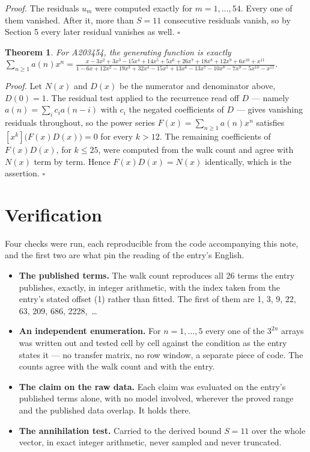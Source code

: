 \documentclass[11pt]{article}
\newtheorem{theorem}{Theorem}
\theoremstyle{definition}
\begin{document}
{\itshape Proof.} The residuals $u_m$ were computed exactly for $m = 1,\dots,54$. Every one of them vanished. After it, more than $S = 11$ consecutive residuals vanish, so by Section 5 every later residual vanishes as well. $\square$

\begin{theorem} For A203454, the generating function is exactly $\sum_{n\ge 1} a(n)x^n = \frac{x - 3x^{2} + 3x^{3} - 15x^{4} + 14x^{5} + 5x^{6} + 26x^{7} + 18x^{8} + 12x^{9} + 6x^{10} + x^{11}}{1 - 6x + 12x^{2} - 19x^{3} + 32x^{4} - 15x^{5} + 13x^{6} - 13x^{7} - 10x^{8} - 7x^{9} - 5x^{10} - x^{11}}$.\end{theorem}

{\itshape Proof.} Let $N(x)$ and $D(x)$ be the numerator and denominator above, $D(0)=1$. The residual test applied to the recurrence read off $D$ --- namely $a(n) = \sum_i c_i a(n-i)$ with $c_i$ the negated coefficients of $D$ --- gives vanishing residuals throughout, so the power series $F(x)=\sum_{n\ge 1}a(n)x^n$ satisfies $[x^k]\bigl(F(x)D(x)\bigr) = 0$ for every $k > 12$. The remaining coefficients of $F(x)D(x)$, for $k \le 25$, were computed from the walk count and agree with $N(x)$ term by term. Hence $F(x)D(x) = N(x)$ identically, which is the assertion. $\square$

\section{Verification}

Four checks were run, each reproducible from the code accompanying this note, and the first two are what pin the reading of the entry's English.

\begin{itemize}

\item {\bfseries The published terms.} The walk count reproduces all 26 terms the entry publishes, exactly, in integer arithmetic, with the index taken from the entry's stated offset (1) rather than fitted. The first of them are 1, 3, 9, 22, 63, 209, 686, 2228,~\dots

\item {\bfseries An independent enumeration.} For $n = 1,\dots,5$ every one of the $3^{2n}$ arrays was written out and tested cell by cell against the condition as the entry states it --- no transfer matrix, no row window, a separate piece of code. The counts agree with the walk count and with the entry.

\item {\bfseries The claim on the raw data.} Each claim was evaluated on the entry's published terms alone, with no model involved, wherever the proved range and the published data overlap. It holds there.

\item {\bfseries The annihilation test.} Carried to the derived bound $S = 11$ over the whole vector, in exact integer arithmetic, never sampled and never truncated.

\end{itemize}
\end{document}

